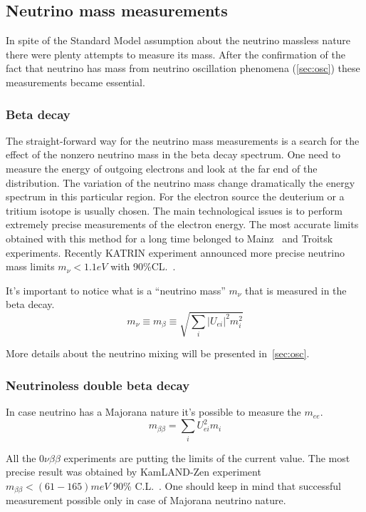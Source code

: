 \documentclass[../main.tex]{subfiles}
\begin{document}
\subsection{Neutrino mass measurements}
In spite of the Standard Model assumption about the neutrino massless nature there were plenty attempts to measure its mass. After the confirmation of the fact that neutrino has mass from neutrino oscillation phenomena (\autoref{sec:osc}) these measurements became essential.

\subsubsection{Beta decay}
The straight-forward way for the neutrino mass measurements is a search for the effect of the nonzero neutrino mass in the beta decay spectrum. One need to measure the energy of outgoing electrons and look at the far end of the distribution. The variation of the neutrino mass change dramatically the energy spectrum in this particular region. For the electron source the deuterium or a tritium isotope is usually chosen. The main technological issues is to perform extremely precise measurements of the electron energy. The most accurate limits obtained with this method for a long time belonged to Mainz~\cite{Kraus2005} and Troitsk~\cite{Aseev2011} experiments. Recently KATRIN experiment announced more precise neutrino mass limits $m_\nu < 1.1 eV$ with 90\%CL.~\cite{Aker2019}.

It's important to notice what is a ``neutrino mass'' $m_\nu$ that is measured in the beta decay.
\begin{equation}
m_\nu\equiv m_\beta\equiv\sqrt{\sum_i\left|U_{ei}\right|^2m_i^2}
\end{equation}

More details about the neutrino mixing will be presented in~\autoref{sec:osc}.

\subsubsection{Neutrinoless double beta decay}
In case neutrino has a Majorana nature it's possible to measure the $m_{ee}$.
\begin{equation}
m_{\beta\beta}=\sum_i U^2_{ei}m_i
\end{equation}

All the $0\nu\beta\beta$ experiments are putting the limits of the current value. The most precise result was obtained by KamLAND-Zen experiment $m_{\beta\beta} < (61-165) meV$ 90\% C.L.~\cite{Gando2016}. One should keep in mind that successful measurement possible only in case of Majorana neutrino nature.
\end{document}
